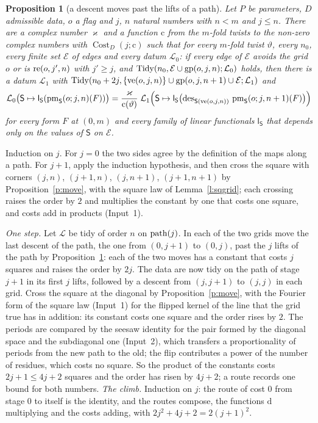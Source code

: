 \documentclass[11pt,a4paper]{article}
\makeatletter
\newcommand{\lean}[1]{\csname LN@#1\endcsname}
\newcommand{\leantag}{{\sffamily\bfseries\fontsize{6.3}{8}\selectfont\color{leancol}\addfontfeatures{LetterSpace=7}LEAN}}
\newcommand{\leanline}[1]{\par\nopagebreak\vspace{-2.5pt}{\fontsize{8.9}{12.4}\selectfont\color{inksoft}\raggedright
  \noindent\llap{\leantag\hspace{9pt}}#1\par}\vspace{1pt}}
\theoremstyle{plainx}
\newtheorem{proposition}[theorem]{Proposition}
\theoremstyle{uprightx}
\renewenvironment{proof}[1][Proof]{\par\pushQED{\qed}\normalfont\topsep0pt\partopsep0pt
  \trivlist\item[\hskip\labelsep\itshape #1.]\ignorespaces}{\popQED\endtrivlist\@endpefalse}
\newcommand{\sS}{\mathsf{S}}
\newcommand{\rc}{\mathrm{c}}
\newcommand{\cL}{\mathcal{L}}
\newcommand{\cE}{\mathcal{E}}
\newcommand{\Cost}[3]{\operatorname{Cost}_{#1}(#2;#3)}
\newcommand{\dn}[2]{\operatorname{des}^{#1}_{#2}}
\makeatother
\begin{document}
\begin{proposition}[a descent moves past the lifts of a path]\label{p:past}
Let $P$ be parameters, $D$ admissible data, $o$ a flag and $j$, $n$ natural numbers with $n<m$ and $j\le n$.
There are a complex number $\varkappa$ and a function $\rc$ from the $m$-fold twists to the non-zero complex
numbers with $\Cost{D}{j}{\rc}$ such that for every $m$-fold twist $\vartheta$, every $n_0$, every finite set
$\cE$ of edges and every datum $\cL_0$: if every edge of $\cE$ avoids the grid $o$ or is $\operatorname{re}(o,j',n)$
with $j'\ge j$, and $\IsTidy{n_0}{\cE\cup\gridPath{o}{j}{n}}{\cL_0}$ holds, then there is a datum $\cL_1$ with
$\IsTidy{n_0+2j}{\{\verticalEdge{o}{j}{n}\}\cup\gridPath{o}{j}{n+1}\cup\cE}{\cL_1}$ and
\[\cL_0\bigl(\sS\mapsto\mathsf{l}_{\sS}(\gridPathMap{\sS}{o}{j}{n}{F})\bigr)
=\frac{\varkappa}{\rc(\vartheta)}\;\cL_1\Bigl(\sS\mapsto\mathsf{l}_{\sS}\bigl(\dn{}{\sS(\verticalEdge{o}{j}{n})}\,\gridPathMap{\sS}{o}{j}{n+1}{F}\bigr)\Bigr)\]
for every form $F$ at $(0,m)$ and every family of linear functionals $\mathsf{l}_{\sS}$ that depends only on the
values of $\sS$ on $\cE$.
\end{proposition}
\begin{proof}
Induction on $j$. For $j=0$ the two sides agree by the definition of the maps along a path. For $j+1$, apply the
induction hypothesis, and then cross the square with corners $(j,n)$, $(j+1,n)$, $(j,n+1)$, $(j+1,n+1)$ by
Proposition~\ref{p:move}, with the square law of Lemma~\ref{l:sqgrid}; each crossing raises the order by $2$ and
multiplies the constant by one that costs one square, and costs add in products (Input~1).
\end{proof}
\leanline{\lean{descentpastgridPathMap}}

\begin{proof}[Proof of Theorem 2$'$ and Theorem 2]
\emph{One step.} Let $\cL$ be tidy of order $n$ on $\operatorname{path}(j)$. In each of the two grids move the last descent of
the path, the one from $(0,j+1)$ to $(0,j)$, past the $j$ lifts of the path by Proposition~\ref{p:past}: each of
the two moves has a constant that costs $j$ squares and raises the order by $2j$. The data are now tidy on the path
of stage $j+1$ in its first $j$ lifts, followed by a descent from $(j,j+1)$ to $(j,j)$ in each grid. Cross the
square at the diagonal by Proposition~\ref{p:move}, with the Fourier form of the square law (Input~1) for the
flipped kernel of the line that the grid true has in addition: its constant costs one square and the order rises
by $2$. The periods are compared by the seesaw identity for the pair formed by the diagonal space and the
subdiagonal one (Input~2), which transfers a proportionality of periods from the new path to the old; the flip
contributes a power of the number of residues, which costs no square. So the product of the constants costs
$2j+1\le4j+2$ squares and the order has risen by $4j+2$; a route records one bound for both numbers. \emph{The climb.} Induction on $j$: the route of cost
$0$ from stage $0$ to itself is the identity, and the routes compose, the functions $\mathrm{d}$ multiplying and
the costs adding, with $2j^2+4j+2=2(j+1)^2$.
\end{proof}
\end{document}
